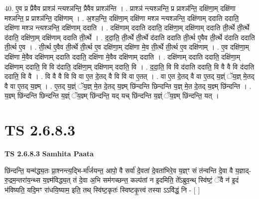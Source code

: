 \documentclass[17pt]{extarticle}
\begin{document}
40. ए॒व प्र प्रैवैव प्राश्ञ॑ न्त्यश्ञन्ति॒ प्रैवैव प्राश्ञ॑न्ति । . प्राश्ञ॑ न्त्यश्ञन्ति॒ प्र प्राश्ञ॑न्ति॒ दक्षि॑णा॒म् दक्षि॑णा मश्ञन्ति॒ प्र प्राश्ञ॑न्ति॒ दक्षि॑णाम् । . अ॒श्ञ॒न्ति॒ दक्षि॑णा॒म् दक्षि॑णा मश्ञ न्त्यश्ञन्ति॒ दक्षि॑णाम् ददाति ददाति॒ दक्षि॑णा मश्ञ न्त्यश्ञन्ति॒ दक्षि॑णाम् ददाति । . दक्षि॑णाम् ददाति ददाति॒ दक्षि॑णा॒म् दक्षि॑णाम् ददाति ती॒र्त्थे ती॒र्त्थे द॑दाति॒ दक्षि॑णा॒म् दक्षि॑णाम् ददाति ती॒र्त्थे । . द॒दा॒ति॒ ती॒र्त्थे ती॒र्त्थे द॑दाति ददाति ती॒र्त्थ ए॒वैव ती॒र्त्थे द॑दाति ददाति ती॒र्त्थ ए॒व । . ती॒र्त्थ ए॒वैव ती॒र्त्थे ती॒र्त्थ ए॒व दक्षि॑णा॒म् दक्षि॑णा मे॒व ती॒र्त्थे ती॒र्त्थ ए॒व दक्षि॑णाम् । . ए॒व दक्षि॑णा॒म् दक्षि॑णा मे॒वैव दक्षि॑णाम् ददाति ददाति॒ दक्षि॑णा मे॒वैव दक्षि॑णाम् ददाति । . दक्षि॑णाम् ददाति ददाति॒ दक्षि॑णा॒म् दक्षि॑णाम् ददाति॒ वि वि द॑दाति॒ दक्षि॑णा॒म् दक्षि॑णाम् ददाति॒ वि । . द॒दा॒ति॒ वि वि द॑दाति ददाति॒ वि वै वै वि द॑दाति ददाति॒ वि वै । . वि वै वै वि वि वा ए॒त दे॒तद् वै वि वि वा ए॒तत् । . वा ए॒त दे॒तद् वै वा ए॒तद् य॒ज्ञ्ं ॅय॒ज्ञ् मे॒तद् वै वा ए॒तद् य॒ज्ञ्म् । . ए॒तद् य॒ज्ञ्ं ॅय॒ज्ञ् मे॒त दे॒तद् य॒ज्ञ्म् छि॑न्दन्ति छिन्दन्ति य॒ज्ञ् मे॒त दे॒तद् य॒ज्ञ्म् छि॑न्दन्ति । . य॒ज्ञ्म् छि॑न्दन्ति छिन्दन्ति य॒ज्ञ्ं ॅय॒ज्ञ्म् छि॑न्दन्ति॒ यद् यच् छि॑न्दन्ति य॒ज्ञ्ं ॅय॒ज्ञ्म् छि॑न्दन्ति॒ यत् । \newline
\pagebreak
{}
\section*{ TS 2.6.8.3 }

\textbf{TS 2.6.8.3 } \newline
\textbf{Samhita Paata} \newline

छि॑न्दन्ति॒ यन्म॑द्ध्य॒तः प्रा॒श्नन्त्य॒द्भि-र्मा᳚र्जयन्त॒ आपो॒ वै सर्वा॑ दे॒वता॑ दे॒वता॑भिरे॒व य॒ज्ञ्ꣳ सं त॑न्वन्ति दे॒वा वै य॒ज्ञाद्-रु॒द्रम॒न्तरा॑य॒न्थ्स य॒ज्ञ्म॑विद्ध्य॒त् तं दे॒वा अ॒भि सम॑गच्छन्त॒ कल्प॑तां न इ॒दमिति॒ ते᳚ऽब्रुव॒न्थ् स्वि॑ष्टं॒ ॅवै न॑ इ॒दं भ॑विष्यति॒ यदि॒मꣳ रा॑धयि॒ष्याम॒ इति॒ तथ् स्वि॑ष्ट॒कृतः॑ स्विष्टकृ॒त्त्वं तस्या ऽऽवि॑द्धं॒ नि - [  ] \newline
\end{document}
